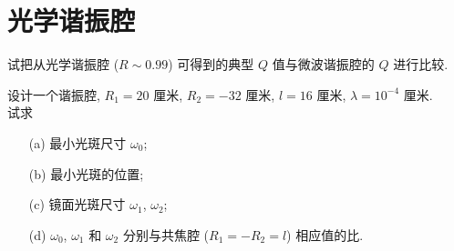 \documentclass{note}
\begin{document}
\setcounter{chapter}{7}
\fi
\chapter{光学谐振腔}
\begin{exe}
    试把从光学谐振腔 ($R\sim 0.99$) 可得到的典型 $Q$ 值与微波谐振腔的 $Q$ 进行比较.
\end{exe}
\begin{pf}
    
\end{pf}

\begin{exe}
    设计一个谐振腔, $R_1=20$ 厘米, $R_2=-32$ 厘米, $l=16$ 厘米, $\lambda=10^{-4}$ 厘米.\\
    试求
    \begin{itemize}
        \item[(a)] 最小光斑尺寸 $\omega_0$;
        \item[(b)] 最小光斑的位置;
        \item[(c)] 镜面光斑尺寸 $\omega_1$, $\omega_2$;
        \item[(d)] $\omega_0$, $\omega_1$ 和 $\omega_2$ 分别与共焦腔 ($R_1=-R_2=l$) 相应值的比.
    \end{itemize}
\end{exe}
\end{document}
